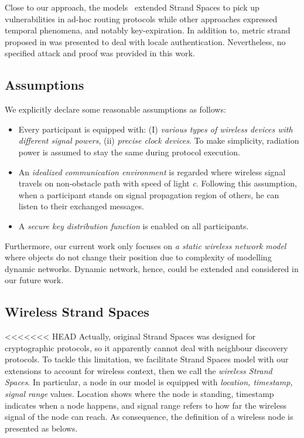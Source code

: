 \begin{flushleft}
\begin{flushleft}
Close to our approach, the models~\cite{Yang03modelingvulnerabilities, 4481351} extended Strand Spaces to pick up vulnerabilities in ad-hoc routing protocols while other approaches \cite{Li:2007:ESS:1338438.1338469, Sharp:2007:TTS:2391910.2391948} expressed temporal phenomena, and notably key-expiration. In addition to, metric strand proposed in \cite{Thayer:2010aa} was presented to deal with locale authentication. Nevertheless, no specified attack and proof was provided in this work. 

\subsection{Assumptions}

We explicitly declare some reasonable assumptions as follows:
\begin{itemize}
\item Every participant is equipped with: (I) \textit{various types of wireless devices with different signal powers}, (ii) \textit{precise clock devices}. To make simplicity, radiation power is assumed to stay the same during protocol execution.
\item An \textit{idealized communication environment} is regarded where wireless signal travels on non-obstacle path with speed of light \emph{c}. Following this assumption, when a participant stands on signal propagation region of others, he can listen to their exchanged messages. 
\item A \textit{secure key distribution function} is enabled on all participants. 
\end{itemize}

Furthermore, our current work only focuses on \textit{a static wireless network model} where objects do not change their position due to complexity of modelling dynamic networks. Dynamic network, hence, could be extended and considered in our future work. 

\subsection{Wireless Strand Spaces}

<<<<<<< HEAD
Actually, original Strand Spaces was designed for cryptographic protocols, so it apparently cannot deal with neighbour discovery protocols. To tackle this limitation, we facilitate Strand Spaces model with our extensions to account for wireless context, then we call the \textit{wireless Strand Spaces}. In particular, a node in our model is equipped with \textit{location, timestamp, signal range} values. Location shows where the node is standing, timestamp indicates when a node happens, and signal range refers to how far the wireless signal of the node can reach. As consequence, the definition of a wireless node is presented as belows.


\end{flushleft}
\end{flushleft}
